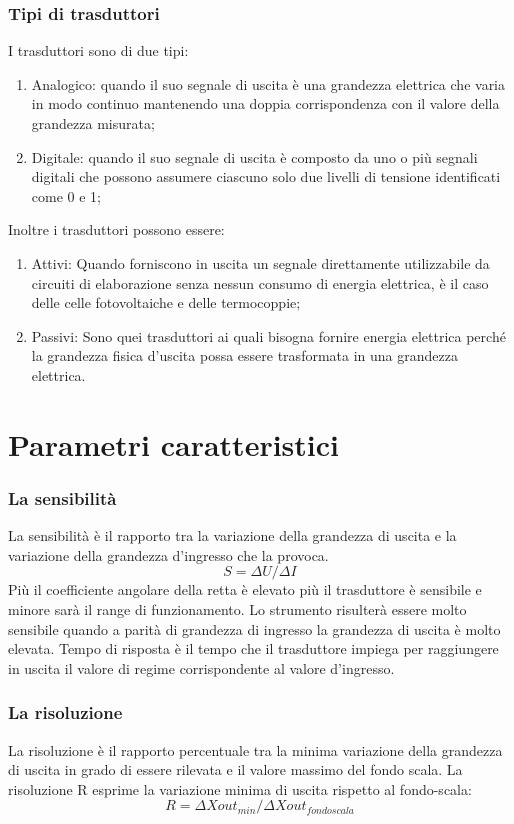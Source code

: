 \documentclass[a4paper,12pt]{article}
\begin{document}
\section{Tipi di trasduttori}
I trasduttori sono di due tipi:
\begin{enumerate}
\item Analogico: quando il suo segnale di uscita è una grandezza elettrica che varia in modo continuo mantenendo una doppia corrispondenza con il valore della grandezza misurata;
\item Digitale: quando il suo segnale di uscita è composto da uno o più segnali digitali che possono assumere ciascuno solo due livelli di tensione identificati come 0 e 1;
\end{enumerate}
Inoltre i trasduttori possono essere:
\begin{enumerate}
\item Attivi: Quando forniscono in uscita un segnale direttamente utilizzabile da circuiti di elaborazione senza nessun consumo di energia elettrica, è il caso delle celle fotovoltaiche e delle termocoppie;
\item Passivi: Sono quei trasduttori ai quali bisogna fornire energia elettrica perché la grandezza fisica d'uscita possa essere trasformata in una grandezza elettrica.
\end{enumerate}



\part{Parametri caratteristici}
\section{La sensibilità}
La sensibilità è il rapporto tra la variazione della grandezza di uscita e la variazione della grandezza d'ingresso che la provoca. 
\begin{equation}
S = \Delta U / \Delta I
\end{equation}
Più il coefficiente angolare della retta è elevato più il trasduttore è sensibile e minore sarà il range di funzionamento. Lo strumento risulterà essere molto sensibile quando a parità di grandezza di ingresso la grandezza di uscita è molto elevata.
Tempo di risposta è il tempo che il trasduttore impiega per raggiungere in uscita il valore di regime corrispondente al valore d'ingresso. 

\section{La risoluzione}
La risoluzione è il rapporto percentuale tra la minima variazione della grandezza di uscita in grado di essere rilevata e il valore massimo del fondo scala.
La risoluzione R esprime la variazione minima di uscita rispetto al fondo-scala:
\begin{equation}
R = \Delta Xout_{min} / \Delta Xout_{fondoscala}
\end{equation}
\end{document}
